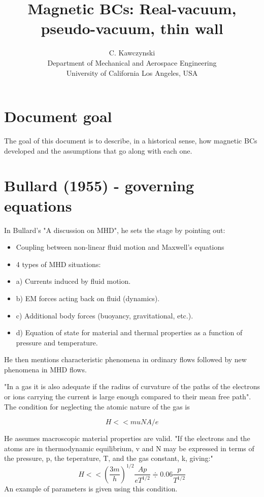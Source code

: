 \documentclass[11pt]{article}
\begin{document}
\doublespacing
\title{Magnetic BCs: Real-vacuum, pseudo-vacuum, thin wall}
\author{C. Kawczynski \\
Department of Mechanical and Aerospace Engineering \\
University of California Los Angeles, USA\\
}
\maketitle

\section{Document goal}
The goal of this document is to describe, in a historical sense, how magnetic BCs developed and the assumptions that go along with each one.

\section{Bullard (1955) - governing equations}
In Bullard's "A discussion on MHD", he sets the stage by pointing out:
\begin{itemize}
\item Coupling between non-linear fluid motion and Maxwell's equations
\item 4 types of MHD situations:
\item a) Currents induced by fluid motion.
\item b) EM forces acting back on fluid (dynamics).
\item c) Additional body forces (buoyancy, gravitational, etc.).
\item d) Equation of state for material and thermal properties as a function of pressure and temperature.
\end{itemize}
He then mentions characteristic phenomena in ordinary flows followed by new phenomena in MHD flows.

"In a gas it is also adequate if the radius of curvature of the paths of the electrons or ions carrying the current is large enough compared to their mean free path". The condition for neglecting the atomic nature of the gas is

\begin{equation}
	H << m u N A / e
\end{equation}

He assumes macroscopic material properties are valid. "If the electrons and the atoms are in thermodynamic equilibrium, v and N may be expressed in terms of the pressure, p, the teperature, T, and the gas constant, k, giving:"
\begin{equation}
	H << \left( \frac{3m}{h} \right)^{1/2} \frac{Ap}{eT^{1/2}} \doteqdot 0.06 \frac{p}{T^{1/2}}
\end{equation}
An example of parameters is given using this condition.
\end{document}

